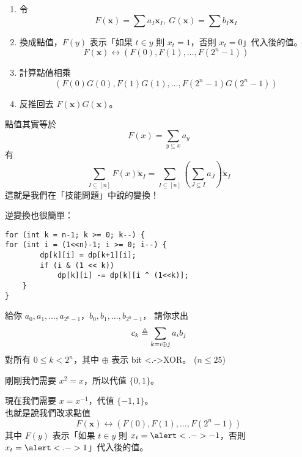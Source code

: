 \documentclass[standalone]{beamer}
\begin{document}
\begin{frame}{}
  \begin{enumerate}[<+->]
    \item 令
      \[ F(\bm{x}) = \sum a_I \bm{x}_I,\ G(\bm{x}) = \sum b_I \bm{x}_I \]
    \item 換成點值，$F(y)$ 表示「如果 $t \in y$ 則 $x_t = 1$，否則 $x_t = 0$」代入後的值。 
      \[ F(\bm{x}) \longleftrightarrow (F(0), F(1), \dots, F(2^n-1)) \]
    \item 計算點值相乘
      \[ (F(0)G(0), F(1)G(1), \dots, F(2^n-1) G(2^n-1)) \]
    \item 反推回去 $F(\bm{x})G(\bm{x})$。
  \end{enumerate}
\end{frame}

\begin{frame}{}
  點值其實等於
  \[ F(x) = \sum_{y \subseteq x} a_y \]
  \pause
  有
  \[ \sum_{I \subseteq [n]} F(x) \tilde{\bm{x}}_I = \sum_{I \subseteq [n]} \left(\sum_{J \subseteq I} a_J\right) \tilde{\bm{x}}_I \]
  \pause
  這就是我們在「技能問題」中說的變換！
\end{frame}

\begin{frame}[fragile]{}
  逆變換也很簡單：
  \begin{verbatim}
for (int k = n-1; k >= 0; k--) {
for (int i = (1<<n)-1; i >= 0; i--) {
        dp[k][i] = dp[k+1][i];
        if (i & (1 << k))
            dp[k][i] -= dp[k][i ^ (1<<k)];
    }
}
\end{verbatim}
\end{frame}

\begin{frame}{}
  \begin{problem}[經典問題]
    給你 $a_0, a_1, \dots, a_{2^n-1}$，$b_0, b_1, \dots, b_{2^n-1}$，
    請你求出
    \[ c_k \triangleq \sum_{k = i \oplus j} a_i b_j \]
    對所有 $0 \leq k < 2^n$，其中 $\oplus$ 表示 bit \alert<.->{XOR}。 ($n \leq 25$)
  \end{problem}
\end{frame}

\begin{frame}{}
  剛剛我們需要 $x^2 = x$，所以代值 $\{0, 1\}$。
  \pause

  現在我們需要 $x = x^{-1}$，代值 $\{-1, 1\}$。 \\
  也就是說我們改求點值
  \[ F(\bm{x}) \longleftrightarrow (F(0), F(1), \dots, F(2^n-1)) \] \pause
  其中 $F(y)$ 表示「如果 $t \in y$ 則 $x_t = \alert<.->{-1}$，否則 $x_t = \alert<.->{1}$」代入後的值。 
\end{frame}
\end{document}
